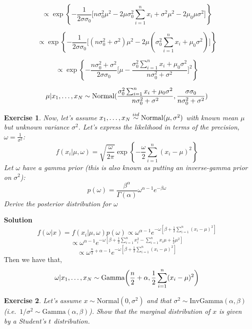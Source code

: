 \documentclass[twoside]{article}
\newcounter{lecnum}
\newtheorem{exercise}{Exercise}[lecnum]
\begin{document}
$$\propto \exp\left\{  
-\frac{1}{2 \sigma \sigma_0} \bigg[
n\sigma_0^2\mu^2 - 2\mu\sigma_0^2 \sum_{i=1}^{n} x_i 
+ \sigma^2 \mu^2 - 2\mu_0 \mu \sigma^2
\bigg]
\right\} $$

$$\propto \exp\left\{  
-\frac{1}{2 \sigma \sigma_0} \bigg[
(n\sigma_0^2 + \sigma^2)\mu^2 - 2 \mu (\sigma_0^2\sum_{i=1}^{n} x_i +\mu_0 \sigma^2 )
\bigg]
\right\} $$

$$\propto \exp\left\{  
-\frac{n \sigma_0^2 + \sigma^2 }{2 \sigma \sigma_0}\bigg[
\mu - \frac{ \sigma_0^2 \sum_{i=1}^{n} x_i + \mu_0 \sigma^2}{ n \sigma_0^2 + \sigma^2}
\bigg]^2
\right\} $$

$$   \mu|x_1,\dots, x_N  \stackrel{\small{}}{\sim}\mbox{Normal}( 
\frac{ \sigma_0^2 \sum_{i=1}^{n} x_i + \mu_0 \sigma^2}{ n \sigma_0^2 + \sigma^2}, 
\frac{ \sigma \sigma_0}{n \sigma_0^2 + \sigma^2}
) $$
 \color{black}

\begin{exercise}
  Now, let's assume  $x_1,\dots, x_N \stackrel{\small{iid}}{\sim}\mbox{Normal}(\mu, \sigma^2)$ with known mean $\mu$ but unknown variance $\sigma^2$. Let's express the likelihood in terms of the precision, $\omega=\frac{1}{\sigma^2}$:
  $$f(x_i|\mu, \omega) = \sqrt{\frac{\omega}{2\pi}} \exp\left\{-\frac{\omega}{2}\sum_{i=1}^{n}(x_i-\mu)^2\right\}$$
  Let $\omega$ have a gamma prior (this is also known as putting an inverse-gamma prior on $\sigma^2$):
  $$p(\omega) = \frac{\beta^\alpha}{\Gamma(\alpha)}\omega^{\alpha-1}e^{-\beta \omega}$$
  Derive the posterior distribution for $\omega$
  
\end{exercise}

 \color{blue}
\textbf{Solution}
$$  f(\omega | x) = f(x_i|\mu, \omega)p(\omega) \propto \omega^{\alpha-1}e^{-\omega [\beta + \frac{1}{2}\sum_{i=1}^{n}(x_i-\mu)^2 ]}  $$
$$  \propto \omega^{\alpha-1}e^{-\omega [\beta + \frac{1}{2}\sum_{i=1}^{n}x_i^2-\sum_{i=1}^{n}x_i\mu+\frac{1}{2}\mu^2] }  $$
$$ \propto \omega^{\frac{n}{2} + \alpha - 1} e^{-\omega [\beta +\frac{1}{2}\sum_{i=1}^{n}(x_i-\mu)^2  ]}
$$
Then we have that,
$$   \omega |x_1,\dots, x_N  \stackrel{\small{}}{\sim}\mbox{Gamma}\bigg( \frac{n}{2} + \alpha,  \frac{1}{2}\sum_{i=1}^{n}(x_i-\mu)^2\bigg) $$

 \color{black}



\begin{exercise}
  Let's assume $x \sim \mbox{Normal}(0, \sigma^2)$ and that $\sigma^2\sim\mbox{InvGamma}(\alpha,\beta)$ (i.e.\ $1/\sigma^2 \sim \mbox{Gamma}(\alpha,\beta)$). Show that the marginal distribution of $x$ is given by a Student's $t$ distribution.
\end{exercise}
\end{document}

